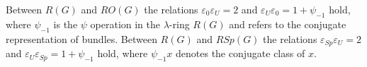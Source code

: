 Between $R(G)$ and $RO(G)$ the relations $\varepsilon_0 \varepsilon_U = 2$ and $\varepsilon_U \varepsilon_0 = 1 + \psi_{-1}$ hold, where $\psi_{-1}$ is the $\psi$ operation in the $\lambda$-ring $R(G)$ and refers to the conjugate representation of bundles. Between $R(G)$ and $RSp(G)$ the relations $\varepsilon_{Sp} \varepsilon_U = 2$ and $\varepsilon_U \varepsilon_{Sp} = 1 + \psi_{-1}$ hold, where $\psi_{-1} x$ denotes the conjugate class of $x$.
